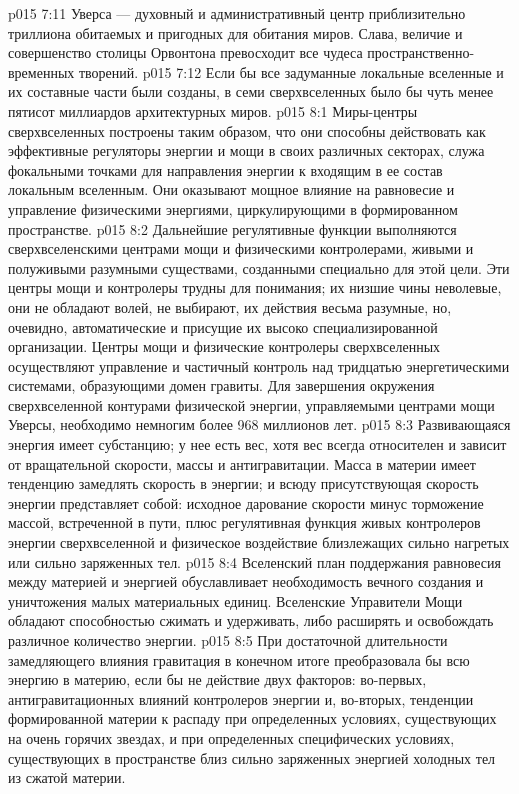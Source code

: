 \vs p015 7:11 Уверса --- духовный и административный центр приблизительно триллиона обитаемых и пригодных для обитания миров. Слава, величие и совершенство столицы Орвонтона превосходит все чудеса пространственно\hyp{}временных творений.
\vs p015 7:12 \pc Если бы все задуманные локальные вселенные и их составные части были созданы, в семи сверхвселенных было бы чуть менее пятисот миллиардов архитектурных миров.
\vs p015 8:1 Миры\hyp{}центры сверхвселенных построены таким образом, что они способны действовать как эффективные регуляторы энергии и мощи в своих различных секторах, служа фокальными точками для направления энергии к входящим в ее состав локальным вселенным. Они оказывают мощное влияние на равновесие и управление физическими энергиями, циркулирующими в формированном пространстве.
\vs p015 8:2 Дальнейшие регулятивные функции выполняются сверхвселенскими центрами мощи и физическими контролерами, живыми и полуживыми разумными существами, созданными специально для этой цели. Эти центры мощи и контролеры трудны для понимания; их низшие чины неволевые, они не обладают волей, не выбирают, их действия весьма разумные, но, очевидно, автоматические и присущие их высоко специализированной организации. Центры мощи и физические контролеры сверхвселенных осуществляют управление и частичный контроль над тридцатью энергетическими системами, образующими домен гравиты. Для завершения окружения сверхвселенной контурами физической энергии, управляемыми центрами мощи Уверсы, необходимо немногим более 968 миллионов лет.
\vs p015 8:3 \pc Развивающаяся энергия имеет субстанцию; у нее есть вес, хотя вес всегда относителен и зависит от вращательной скорости, массы и антигравитации. Масса в материи имеет тенденцию замедлять скорость в энергии; и всюду присутствующая скорость энергии представляет собой: исходное дарование скорости минус торможение массой, встреченной в пути, плюс регулятивная функция живых контролеров энергии сверхвселенной и физическое воздействие близлежащих сильно нагретых или сильно заряженных тел.
\vs p015 8:4 Вселенский план поддержания равновесия между материей и энергией обуславливает необходимость вечного создания и уничтожения малых материальных единиц. Вселенские Управители Мощи обладают способностью сжимать и удерживать, либо расширять и освобождать различное количество энергии.
\vs p015 8:5 При достаточной длительности замедляющего влияния гравитация в конечном итоге преобразовала бы всю энергию в материю, если бы не действие двух факторов: во\hyp{}первых, антигравитационных влияний контролеров энергии и, во\hyp{}вторых, тенденции формированной материи к распаду при определенных условиях, существующих на очень горячих звездах, и при определенных специфических условиях, существующих в пространстве близ сильно заряженных энергией холодных тел из сжатой материи.
